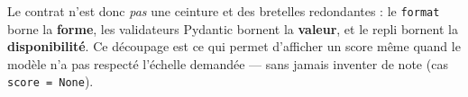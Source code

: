 Le contrat n'est donc \emph{pas} une ceinture et des bretelles redondantes : le
\texttt{format} borne la \textbf{forme}, les validateurs Pydantic bornent la
\textbf{valeur}, et le repli bornent la \textbf{disponibilité}. Ce découpage est
ce qui permet d'afficher un score même quand le modèle n'a pas respecté
l'échelle demandée --- sans jamais inventer de note (cas \texttt{score = None}).
